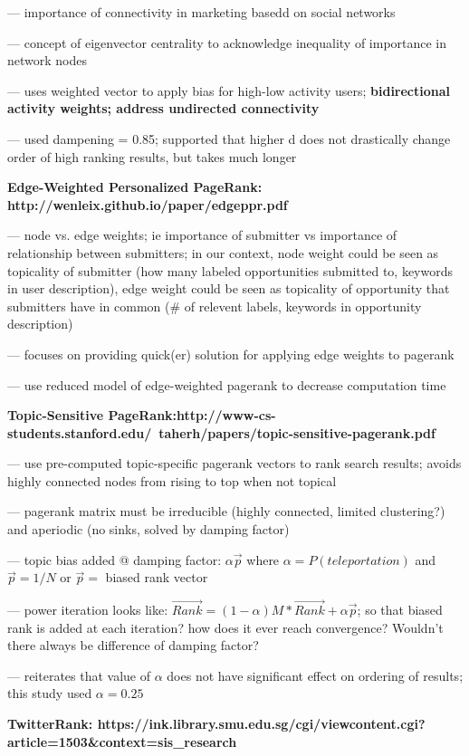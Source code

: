 \documentclass[]{report}   %
\begin{document}
--- importance of connectivity in marketing basedd on social networks

--- concept of eigenvector centrality to acknowledge inequality of importance in network nodes

--- uses weighted vector to apply bias for high-low activity users; \textbf{ bidirectional activity weights; address undirected connectivity}

--- used dampening = 0.85; supported that higher d does not drastically change order of high ranking results, but takes much longer

\textbf{Edge-Weighted Personalized PageRank: http://wenleix.github.io/paper/edgeppr.pdf}

--- node vs. edge weights; ie importance of submitter vs importance of relationship between submitters; in our context, node weight could be seen as topicality of submitter (how many labeled opportunities submitted to, keywords in user description), edge weight could be seen as topicality of opportunity that submitters have in common (\# of relevent labels, keywords in opportunity description)

--- focuses on providing quick(er) solution for applying edge weights to pagerank

--- use reduced model of edge-weighted pagerank to decrease computation time

\textbf{Topic-Sensitive PageRank:http://www-cs-students.stanford.edu/~taherh/papers/topic-sensitive-pagerank.pdf}

--- use pre-computed topic-specific pagerank vectors to rank search results; avoids highly connected nodes from rising to top when not topical

--- pagerank matrix must be irreducible (highly connected, limited clustering?) and aperiodic (no sinks, solved by damping factor)

--- topic bias added @ damping factor: $\alpha \vec{p}$ where $\alpha = P(teleportation)$ and $\vec{p} = 1/N$ or $\vec{p} =$ biased rank vector

--- power iteration looks like: $\vec{Rank} = (1- \alpha )M * \vec{Rank} + \alpha \vec{p}$; so that biased rank is added at each iteration? how does it ever reach convergence? Wouldn't there always be difference of damping factor?

--- reiterates that value of $\alpha$ does not have significant effect on ordering of results; this study used $\alpha = 0.25$

\textbf{TwitterRank: https://ink.library.smu.edu.sg/cgi/viewcontent.cgi?article=1503\&context=sis\_research}
\end{document}
